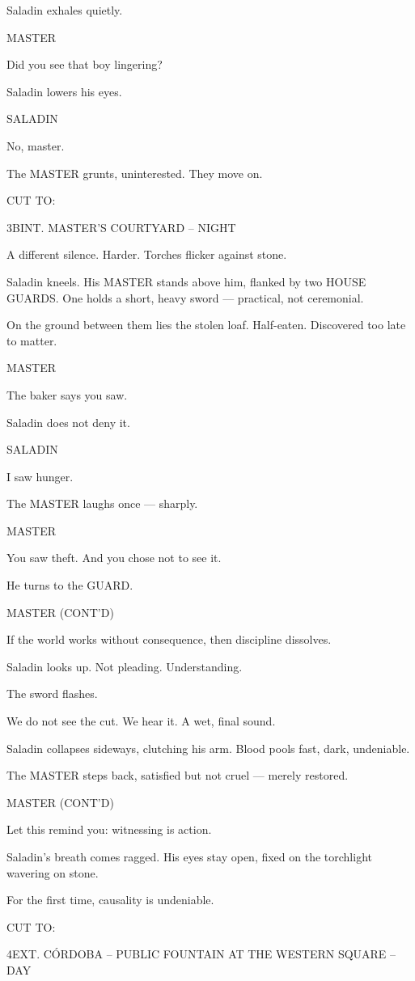 \documentclass[12pt]{article}
\newlength{\charindent}
\newlength{\dialogueindent}
\newlength{\dialoguewidth}
\newlength{\transitionindent}
\newcommand{\slug}[1]{%
  \needspace{4\baselineskip}%
  \vspace{1.5em}%
  \noindent\MakeUppercase{#1}%
  \nopagebreak[4]%
  \par\vspace{0.75em}%
}
\newcommand{\action}[1]{%
  \noindent#1\par\vspace{0.75em}%
}
\newcommand{\character}[1]{%
  \needspace{3\baselineskip}%
  \par\vspace{0.5em}%
  \noindent\hspace*{\charindent}\MakeUppercase{#1}\nopagebreak[4]%
}
\newcommand{\dialogue}[1]{%
  \par\nobreak\nopagebreak[4]%
  \noindent\hspace*{\dialogueindent}%
  \begin{minipage}[t]{\dialoguewidth}
  #1
  \end{minipage}%
  \par\vspace{0.5em}%
}
\newcommand{\transition}[1]{%
  \needspace{2\baselineskip}%
  \par\vspace{1em}%
  \noindent\hspace*{\transitionindent}\MakeUppercase{#1}%
  \par%
}
\newcommand{\contd}{\textsc{(cont'd)}}
\begin{document}
\action{Saladin exhales quietly.}

\character{MASTER}
\dialogue{Did you see that boy lingering?}

\action{Saladin lowers his eyes.}

\character{SALADIN}
\dialogue{No, master.}

\action{The MASTER grunts, uninterested. They move on.}

\transition{CUT TO:}

\slug{3B\quad INT. MASTER'S COURTYARD -- NIGHT}

\action{A different silence. Harder. Torches flicker against stone.}

\action{Saladin kneels. His MASTER stands above him, flanked by two HOUSE GUARDS. One holds a short, heavy sword — practical, not ceremonial.}

\action{On the ground between them lies the stolen loaf. Half-eaten. Discovered too late to matter.}

\character{MASTER}
\dialogue{The baker says you saw.}

\action{Saladin does not deny it.}

\character{SALADIN}
\dialogue{I saw hunger.}

\action{The MASTER laughs once — sharply.}

\character{MASTER}
\dialogue{You saw theft. And you chose not to see it.}

\action{He turns to the GUARD.}

\character{MASTER \contd}
\dialogue{If the world works without consequence, then discipline dissolves.}

\action{Saladin looks up. Not pleading. Understanding.}

\action{The sword flashes.}

\action{We do not see the cut. We hear it. A wet, final sound.}

\action{Saladin collapses sideways, clutching his arm. Blood pools fast, dark, undeniable.}

\action{The MASTER steps back, satisfied but not cruel — merely restored.}

\character{MASTER \contd}
\dialogue{Let this remind you: witnessing is action.}

\action{Saladin’s breath comes ragged. His eyes stay open, fixed on the torchlight wavering on stone.}

\action{For the first time, causality is undeniable.}

\transition{CUT TO:}
\slug{4\quad EXT. C\'ORDOBA -- PUBLIC FOUNTAIN AT THE WESTERN SQUARE -- DAY}
\end{document}
